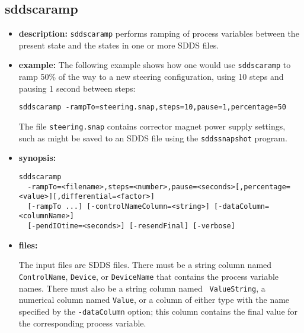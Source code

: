 %
%
\begin{latexonly}
\newpage
\end{latexonly}

%
%
\subsection{sddscaramp}
\label{sddscaramp}

\begin{itemize}
\item {\bf description:}
%
%
\verb+sddscaramp+ performs ramping of process variables between
the present state and the states in one or more SDDS files.

\item {\bf example:} 
%
% 
%
The following example shows how one would use \verb+sddscaramp+ to
ramp 50\% of the way to a new steering configuration, using 10
steps and pausing 1 second between steps: 
\begin{verbatim}
sddscaramp -rampTo=steering.snap,steps=10,pause=1,percentage=50
\end{verbatim}
The file \verb+steering.snap+ contains corrector magnet power supply
settings, such as might be saved to an SDDS file using the
\verb+sddssnapshot+ program.
\item {\bf synopsis:} 
%
%
\begin{verbatim}
sddscaramp
  -rampTo=<filename>,steps=<number>,pause=<seconds>[,percentage=<value>][,differential=<factor>]
  [-rampTo ...] [-controlNameColumn=<string>] [-dataColumn=<columnName>]
  [-pendIOtime=<seconds>] [-resendFinal] [-verbose]
\end{verbatim}
\item {\bf files:}

The input files are SDDS files.  There must be a string column named
{\tt ControlName}, {\tt Device}, or {\tt DeviceName} that contains the
process variable names.  There must also be a string column named {\tt
ValueString}, a numerical column named {\tt Value}, or a column of
either type with the name specified by the \verb+-dataColumn+ option;
this column contains the final value for the corresponding process
variable.  


\end{itemize}
